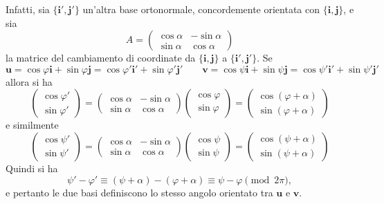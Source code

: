 \documentclass{article}
\theoremstyle{plain}
\theoremstyle{definition}
\theoremstyle{remark}
\begin{document}
Infatti, sia $\{\mathbf{i}', \mathbf{j}'\}$ un'altra base ortonormale, concordemente orientata con 
$\{\mathbf{i}, \mathbf{j}\}$, e sia
\[A = \begin{pmatrix}
\cos\alpha & -\sin\alpha \\
\sin\alpha & \cos\alpha
\end{pmatrix}\]
la matrice del cambiamento di coordinate da $\{\mathbf{i}, \mathbf{j}\}$ a $\{\mathbf{i}', \mathbf{j}'\}$. 
Se
\[\mathbf{u} = \cos\varphi \mathbf{i} + \sin\varphi \mathbf{j} = \cos\varphi' \mathbf{i'} + \sin\varphi' \mathbf{j'} \quad\quad\mathbf{v} = \cos\psi \mathbf{i} + \sin\psi \mathbf{j} = \cos\psi' \mathbf{i'} + \sin\psi' \mathbf{j'}\]
allora si ha
\[\begin{pmatrix}
\cos\varphi' \\
\sin\varphi'
\end{pmatrix} = \begin{pmatrix}
\cos\alpha & -\sin\alpha \\
\sin\alpha & \cos\alpha
\end{pmatrix} \begin{pmatrix}
\cos\varphi \\
\sin\varphi
\end{pmatrix} = \begin{pmatrix}
\cos(\varphi + \alpha) \\
\sin(\varphi + \alpha)
\end{pmatrix}\]
e similmente
\[\begin{pmatrix}
\cos\psi' \\
\sin\psi'
\end{pmatrix} = \begin{pmatrix}
\cos\alpha & -\sin\alpha \\
\sin\alpha & \cos\alpha
\end{pmatrix} \begin{pmatrix}
\cos\psi \\
\sin\psi
\end{pmatrix} = \begin{pmatrix}
\cos(\psi + \alpha) \\
\sin(\psi + \alpha)
\end{pmatrix}\]
Quindi si ha 
\[\psi' - \varphi' \equiv (\psi + \alpha) - (\varphi + \alpha) \equiv \psi - \varphi \pmod{2\pi},\]
e pertanto le due basi definiscono lo stesso angolo orientato tra $\mathbf{u}$ e $\mathbf{v}$.

\vspace{10pt}
\end{document}
